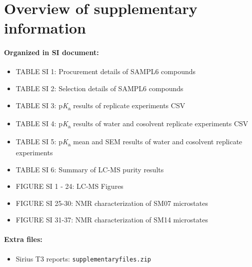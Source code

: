 \documentclass[9pt,lineno]{elife}
\newcommand{\pKa}{p\textit{K}\textsubscript{a}}
\begin{document}
\section{Overview of supplementary information}

\paragraph{Organized in SI document:}

\begin{itemize}
\item TABLE SI 1: Procurement details of SAMPL6 compounds  

\item TABLE SI 2: Selection details of SAMPL6 compounds  

\item TABLE SI 3: \pKa{} results of replicate experiments CSV

\item TABLE SI 4: \pKa{} results of water and cosolvent replicate experiments CSV

\item TABLE SI 5: \pKa{} mean and SEM results of water and cosolvent replicate experiments

\item TABLE SI 6: Summary of LC-MS purity results

\item FIGURE SI 1 - 24:  LC-MS Figures  

\item FIGURE SI 25-30: NMR characterization of SM07 microstates  

\item FIGURE SI 31-37: NMR characterization of SM14 microstates  
\end{itemize}

\paragraph{Extra files:}  
\begin{itemize}
\item Sirius T3 reports: {\tt supplementary\textunderscore files.zip}
\end{itemize}
\end{document}
